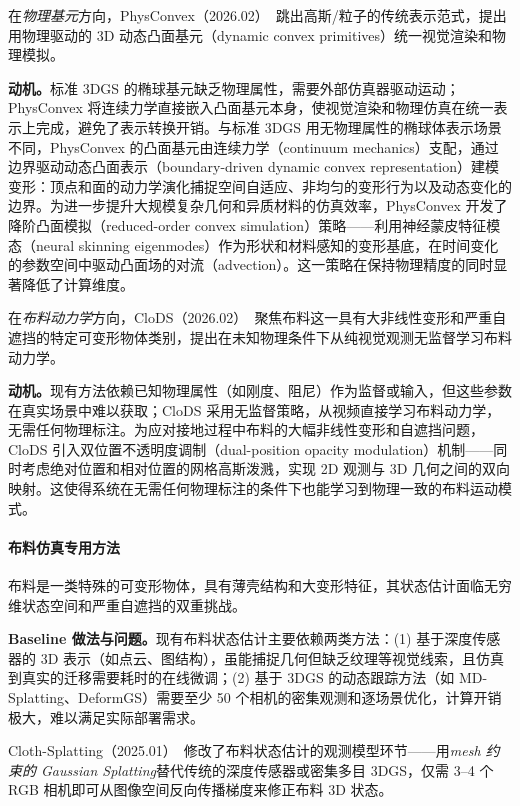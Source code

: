 在\emph{物理基元}方向，PhysConvex（2026.02）~\cite{2602_18886}跳出高斯/粒子的传统表示范式，提出用物理驱动的 3D 动态凸面基元（dynamic convex primitives）统一视觉渲染和物理模拟。

\textbf{动机。}标准 3DGS 的椭球基元缺乏物理属性，需要外部仿真器驱动运动；PhysConvex 将连续力学直接嵌入凸面基元本身，使视觉渲染和物理仿真在统一表示上完成，避免了表示转换开销。与标准 3DGS 用无物理属性的椭球体表示场景不同，PhysConvex 的凸面基元由连续力学（continuum mechanics）支配，通过边界驱动动态凸面表示（boundary-driven dynamic convex representation）建模变形：顶点和面的动力学演化捕捉空间自适应、非均匀的变形行为以及动态变化的边界。为进一步提升大规模复杂几何和异质材料的仿真效率，PhysConvex 开发了降阶凸面模拟（reduced-order convex simulation）策略——利用神经蒙皮特征模态（neural skinning eigenmodes）作为形状和材料感知的变形基底，在时间变化的参数空间中驱动凸面场的对流（advection）。这一策略在保持物理精度的同时显著降低了计算维度。

在\emph{布料动力学}方向，CloDS（2026.02）~\cite{2602_01844}聚焦布料这一具有大非线性变形和严重自遮挡的特定可变形物体类别，提出在未知物理条件下从纯视觉观测无监督学习布料动力学。

\textbf{动机。}现有方法依赖已知物理属性（如刚度、阻尼）作为监督或输入，但这些参数在真实场景中难以获取；CloDS 采用无监督策略，从视频直接学习布料动力学，无需任何物理标注。为应对接地过程中布料的大幅非线性变形和自遮挡问题，CloDS 引入双位置不透明度调制（dual-position opacity modulation）机制——同时考虑绝对位置和相对位置的网格高斯泼溅，实现 2D 观测与 3D 几何之间的双向映射。这使得系统在无需任何物理标注的条件下也能学习到物理一致的布料运动模式。

\paragraph{布料仿真专用方法}

布料是一类特殊的可变形物体，具有薄壳结构和大变形特征，其状态估计面临无穷维状态空间和严重自遮挡的双重挑战。

\textbf{Baseline 做法与问题。}现有布料状态估计主要依赖两类方法：(1) 基于深度传感器的 3D 表示（如点云、图结构），虽能捕捉几何但缺乏纹理等视觉线索，且仿真到真实的迁移需要耗时的在线微调；(2) 基于 3DGS 的动态跟踪方法（如 MD-Splatting、DeformGS）需要至少 50 个相机的密集观测和逐场景优化，计算开销极大，难以满足实际部署需求。

Cloth-Splatting（2025.01）~\cite{2501_01715}修改了布料状态估计的观测模型环节——用\emph{mesh 约束的 Gaussian Splatting}替代传统的深度传感器或密集多目 3DGS，仅需 3--4 个 RGB 相机即可从图像空间反向传播梯度来修正布料 3D 状态。

